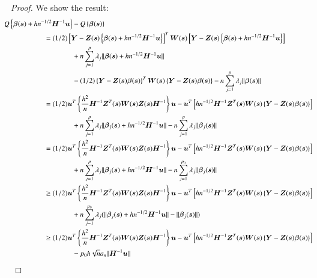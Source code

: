 \documentclass[authoryear, review, 11pt]{elsarticle}
\begin{document}
\begin{proof}
    We show the result:
    \begin{align}\label{eq:consistency}
      \mkern-18mu Q \left\{ \bm{\beta} (\bm{s}) + h n^{-1/2} \bm{H}^{-1} \bm{u} \right\} &- Q \left\{ \bm{\beta}(\bm{s}) \right\} \notag \\
      &\mkern-72mu= (1/2) \left[ \bm{Y} - \bm{Z}(\bm{s}) \left\{ \bm{\beta}(\bm{s}) + h n^{-1/2} \bm{H}^{-1} \bm{u} \right\} \right]^T \bm{W}(\bm{s}) \left[ \bm{Y} - \bm{Z}(\bm{s}) \left\{ \bm{\beta}(\bm{s}) + h n^{-1/2} \bm{H}^{-1} \bm{u} \right\} \right] \notag \\
      &+ n \sum_{j=1}^p \lambda_j \| \bm{\beta}(\bm{s}) + h n^{-1/2} \bm{H}^{-1} \bm{u} \| \notag \\
      &- (1/2) \left\{ \bm{Y} - \bm{Z}(\bm{s}) \bm{\beta}(\bm{s}) \right\}^T \bm{W}(\bm{s}) \left\{ \bm{Y} - \bm{Z}(\bm{s}) \bm{\beta}(\bm{s}) \right\} - n \sum_{j=1}^p \lambda_j \| \bm{\beta}(\bm{s}) \| \notag \\ 
      &\mkern-72mu= (1/2) \bm{u}^T \left\{ \frac{h^2}{n} \bm{H}^{-1} \bm{Z}^T(\bm{s}) \bm{W}(\bm{s}) \bm{Z}(\bm{s}) \bm{H}^{-1} \right\} \bm{u} - \bm{u}^T \left[ h n^{-1/2} \bm{H}^{-1} \bm{Z}^T(\bm{s}) \bm{W}(\bm{s}) \left\{ \bm{Y} - \bm{Z}(\bm{s}) \bm{\beta}(\bm{s}) \right\} \right] \notag \\
      &+ n \sum_{j=1}^p \lambda_j \|\bm{\beta}_j(\bm{s}) + h n^{-1/2} \bm{H}^{-1} \bm{u} \| - n \sum_{j=1}^p \lambda_j \| \bm{\beta}_j(\bm{s}) \| \notag \\
      &\mkern-72mu= (1/2) \bm{u}^T \left\{ \frac{h^2}{n} \bm{H}^{-1} \bm{Z}^T(\bm{s}) \bm{W}(\bm{s}) \bm{Z}(\bm{s}) \bm{H}^{-1} \right\} \bm{u} - \bm{u}^T \left[ h n^{-1/2} \bm{H}^{-1} \bm{Z}^T(\bm{s}) \bm{W}(\bm{s}) \left\{ \bm{Y} - \bm{Z}(\bm{s}) \bm{\beta}(\bm{s}) \right\} \right] \notag \\
      &+ n \sum_{j=1}^p \lambda_j \|\bm{\beta}_j(\bm{s}) + h n^{-1/2} \bm{H}^{-1} \bm{u} \| - n \sum_{j=1}^{p_0} \lambda_j \| \bm{\beta}_j(\bm{s}) \| \notag \\
      &\mkern-72mu\ge (1/2) \bm{u}^T \left\{ \frac{h^2}{n} \bm{H}^{-1} \bm{Z}^T(\bm{s}) \bm{W}(\bm{s}) \bm{Z}(\bm{s}) \bm{H}^{-1} \right\} \bm{u} - \bm{u}^T \left[ h n^{-1/2} \bm{H}^{-1} \bm{Z}^T(\bm{s}) \bm{W}(\bm{s}) \left\{ \bm{Y} - \bm{Z}(\bm{s}) \bm{\beta}(\bm{s}) \right\} \right] \notag \\
      &+ n \sum_{j=1}^{p_0} \lambda_j ( \|\bm{\beta}_j(\bm{s}) + h n^{-1/2} \bm{H}^{-1} \bm{u} \| - \| \bm{\beta}_j(\bm{s}) \| ) \notag \\
      &\mkern-72mu\ge (1/2) \bm{u}^T \left\{ \frac{h^2}{n} \bm{H}^{-1} \bm{Z}^T(\bm{s}) \bm{W}(\bm{s}) \bm{Z}(\bm{s}) \bm{H}^{-1} \right\} \bm{u} - \bm{u}^T \left[ h n^{-1/2} \bm{H}^{-1} \bm{Z}^T(\bm{s}) \bm{W}(\bm{s}) \left\{ \bm{Y} - \bm{Z}(\bm{s}) \bm{\beta}(\bm{s}) \right\} \right] \notag \\
      &- p_0 h \sqrt{n} a_n \| \bm{H}^{-1} \bm{u} \|
    \end{align}
  \end{proof}
\end{document}
